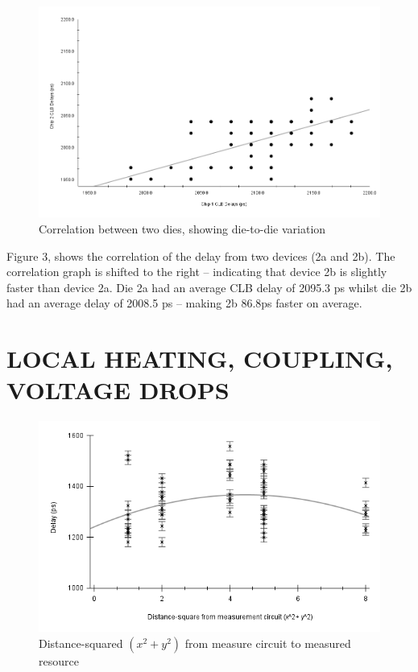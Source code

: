 \documentclass[11pt]{report}
\begin{document}
\begin{mainf}
\begin{figure}[H]
    \centering
    \includegraphics[width=0.5\linewidth]{correlation.png}
    \caption{Correlation between two dies, showing die-to-die variation}
    \label{fig:enter-label}
\end{figure}

Figure 3, shows the correlation of the delay from two devices (2a and 2b). The correlation graph is shifted to the right -- indicating that device 2b is slightly faster than device 2a. Die 2a had an average CLB delay of 2095.3 ps whilst die 2b had an average delay of 2008.5 ps -- making 2b 86.8ps faster on average. 


\section{\textbf{LOCAL HEATING, COUPLING, VOLTAGE DROPS}}

\begin{figure}[H]
    \centering
    \includegraphics[width=0.5\linewidth]{distance-square.png}
    \caption{Distance-squared $(x^2 + y^2)$ from measure circuit to measured resource}
    \label{fig:enter-label}
\end{figure}



\end{mainf}
\end{document}
